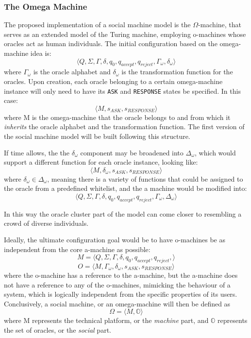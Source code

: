 \documentclass[12pt,a4,xcolor=table]{article}
\begin{document}
\subsubsection{The Omega Machine}\label{sec:omega}
The proposed implementation of a social machine model is the $\Omega$-machine, that serves as an extended model of the Turing machine, employing o-machines whose oracles act as human individuals\cite{Zhang2014}. The initial configuration based on the omega-machine idea is:
\[\langle Q, \Sigma, \Gamma, \delta, q_{0}, q_{accept}, q_{reject},\Gamma_{\omega} ,\delta_{\omega}\rangle\] 
where $\Gamma_{\omega}$ is the oracle alphabet and $\delta_{\omega}$ is the transformation function for the oracles. Upon creation, each oracle belonging to a certain omega-machine instance will only need to have its \texttt{ASK} and \texttt{RESPONSE} states be specified. In this case: \[\langle M, s_{ASK}, s_{RESPONSE} \rangle\] where M is the omega-machine that the oracle belongs to and from which it \textit{inherits} the oracle alphabet and the transformation function. The first version of the social machine model will be built following this structure.

If time allows, the the $\delta_{\omega}$ component may be broadened into $\Delta_{\omega}$, which would support a different function for each oracle instance, looking like: \[\langle M, \delta_{\omega}, s_{ASK}, s_{RESPONSE} \rangle\] where $\delta_{\omega} \in \Delta_{\omega}$, meaning there is a variety of functions that could be assigned to the oracle from a predefined whitelist, and the a machine would be modified into: \[\langle Q, \Sigma, \Gamma, \delta, q_{0}, q_{accept}, q_{reject},\Gamma_{\omega} ,\Delta_{\omega}\rangle\]

In this way the oracle cluster part of the model can come closer to resembling a crowd of diverse individuals.

Ideally, the ultimate configuration goal would be to have o-machines be as independent from the core a-machine as possible:
\[M = \langle Q, \Sigma, \Gamma, \delta, q_{0}, q_{accept}, q_{reject},\rangle\]
\[O = \langle M, \Gamma_{\omega}, \delta_{\omega}, s_{ASK}, s_{RESPONSE} \rangle\]
where the o-machine has a reference to the a-machine, but the a-machine does not have a reference to any of the o-machines, mimicking the behaviour of a system, which is logically independent from the specific properties of its users. Conclusively, a social machine, or an omega-machine will then be defined as \[\Omega = \langle M, \mathbb{O} \rangle \] where M represents the technical platform, or the \textit{machine} part, and $\mathbb{O}$ represents the set of oracles, or the \textit{social} part.
\end{document}
